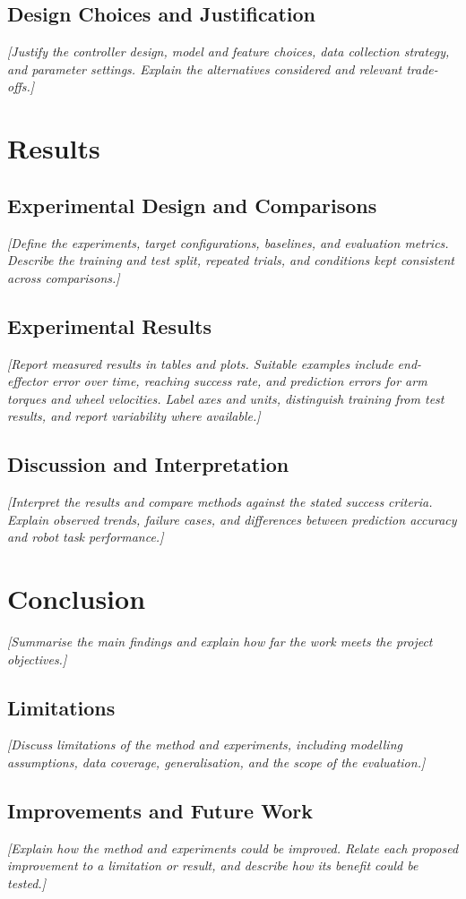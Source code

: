 \documentclass[conference]{IEEEtran}
\begin{document}
\subsection{Design Choices and Justification}
\textit{[Justify the controller design, model and feature choices, data collection strategy, and parameter settings. Explain the alternatives considered and relevant trade-offs.]}

\section{Results}
\subsection{Experimental Design and Comparisons}
\textit{[Define the experiments, target configurations, baselines, and evaluation metrics. Describe the training and test split, repeated trials, and conditions kept consistent across comparisons.]}

\subsection{Experimental Results}
\textit{[Report measured results in tables and plots. Suitable examples include end-effector error over time, reaching success rate, and prediction errors for arm torques and wheel velocities. Label axes and units, distinguish training from test results, and report variability where available.]}

\subsection{Discussion and Interpretation}
\textit{[Interpret the results and compare methods against the stated success criteria. Explain observed trends, failure cases, and differences between prediction accuracy and robot task performance.]}

\section{Conclusion}
\textit{[Summarise the main findings and explain how far the work meets the project objectives.]}

\subsection{Limitations}
\textit{[Discuss limitations of the method and experiments, including modelling assumptions, data coverage, generalisation, and the scope of the evaluation.]}

\subsection{Improvements and Future Work}
\textit{[Explain how the method and experiments could be improved. Relate each proposed improvement to a limitation or result, and describe how its benefit could be tested.]}

\end{document}
